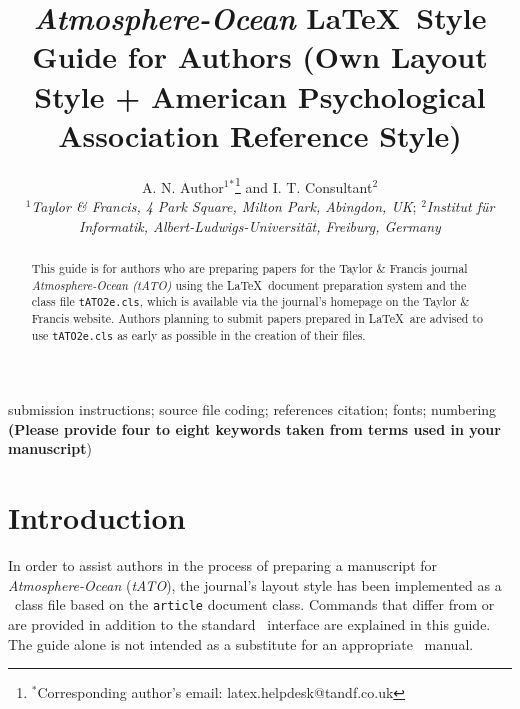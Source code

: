 \documentclass{tATO2e}
\begin{document}


\title{{\itshape Atmosphere-Ocean} \LaTeX\ Style Guide for Authors \break (Own Layout Style + American Psychological Association Reference Style)}

\author{A. N. Author$^{1}$$^{\ast}$\thanks{$^\ast$Corresponding author's email: latex.helpdesk@tandf.co.uk
\vspace{6pt}} and I. T. Consultant$^{2}$\\\vspace{6pt}  $^{1}${\em{Taylor \& Francis, 4 Park Square, Milton Park, Abingdon, UK}};
$^{2}${\em{Institut f\"{u}r Informatik, Albert-Ludwigs-Universit\"{a}t, Freiburg,
Germany}}\\ }

\maketitle

\begin{abstract}
This guide is for authors who are preparing papers for the Taylor \& Francis journal {\em Atmosphere-Ocean (tATO)}
using the \LaTeX\ document preparation system and the class file {\tt tATO2e.cls}, which
is available via the journal's homepage on the Taylor \& Francis website. Authors planning
to submit papers prepared in \LaTeX\ are advised to use {\tt tATO2e.cls} as early as possible in the creation of their files.
\end{abstract}

\begin{keywords}submission instructions; source file coding;
references citation; fonts; numbering {\bf{(Please provide four to eight keywords taken
from terms used in your manuscript}})
\end{keywords}


\section{Introduction}

In order to assist authors in the process of preparing a manuscript for {\itshape Atmosphere-Ocean} ({\it tATO}), the journal's layout style has been implemented as a \LaTeXe\ class file based on the {\tt article} document class. Commands that differ from or are provided in addition to the standard \LaTeXe\ interface are explained in this guide. The guide alone is not intended as a substitute for an appropriate \LaTeXe\ manual.
\end{document}
